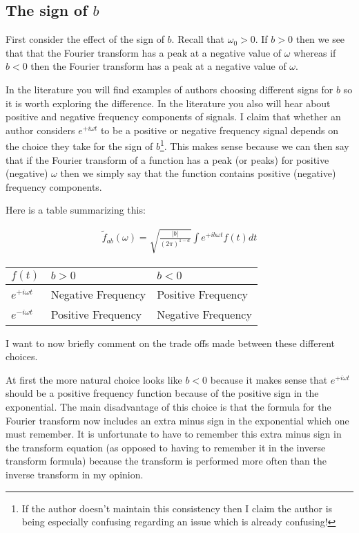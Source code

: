 \documentclass[12pt]{article}
\begin{document}
\subsection{The sign of $b$}
First consider the effect of the sign of $b$. Recall that $\omega_0 > 0 $. If $b>0$ then we see that that the Fourier transform has a peak at a negative value of $\omega$ whereas if $b<0$ then the Fourier transform has a peak at a negative value of $\omega$. 

In the literature you will find examples of authors choosing different signs for $b$ so it is worth exploring the difference. In the literature you also will hear about positive and negative frequency components of signals. I claim that whether an author considers $e^{+i\omega t}$ to be a positive or negative frequency signal depends on the choice they take for the sign of $b$\footnote{If the author doesn't maintain this consistency then I claim the author is being especially confusing regarding an issue which is already confusing!}.  This makes sense because we can then say that if the Fourier transform of a function has a peak (or peaks) for positive (negative) $\omega$ then we simply say that the function contains positive (negative) frequency components.

Here is a table summarizing this:

\begin{align}
\tilde{f}_{ab}(\omega) = \sqrt{\frac{|b|}{(2\pi)^{1-a}}}\int e^{+ib \omega t} f(t) dt
\end{align}

\begin{center}
\begin{tabular}{|m{1cm}|m{4cm}|m{4cm}|}
\hline
$f(t)$ & $b>0$ & $b<0$\\ \hline
$e^{+i\omega t}$ & Negative Frequency & Positive Frequency\\ \hline
$e^{-i\omega t}$ & Positive Frequency & Negative Frequency\\ \hline
\end{tabular}
\end{center}

I want to now briefly comment on the trade offs made between these different choices.

At first the more natural choice looks like $b<0$ because it makes sense that $e^{+i\omega t}$ should be a positive frequency function because of the positive sign in the exponential. The main disadvantage of this choice is that the formula for the Fourier transform now includes an extra minus sign in the exponential which one must remember. It is unfortunate to have to remember this extra minus sign in the transform equation (as opposed to having to remember it in the inverse transform formula) because the transform is performed more often than the inverse transform in my opinion.
\end{document}
